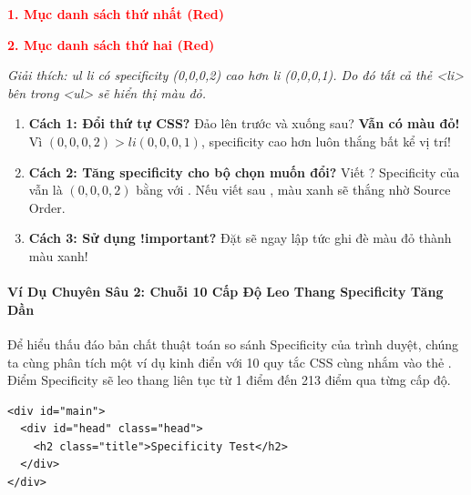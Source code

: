 \begin{browserWindow}
\sffamily\small
\textcolor{red}{\textbf{1. Mục danh sách thứ nhất (Red)}} \par
\textcolor{red}{\textbf{2. Mục danh sách thứ hai (Red)}} \par\vspace{4pt}
{\scriptsize\textcolor{gray!60}{\textit{Giải thích: ul li có specificity (0,0,0,2) cao hơn li (0,0,0,1). Do đó tất cả thẻ <li> bên trong <ul> sẽ hiển thị màu đỏ.}}}
\end{browserWindow}

\begin{conceptBox}
\begin{enumerate}[leftmargin=1.5em, itemsep=3pt, parsep=0pt]
    \item \textbf{Cách 1: Đổi thứ tự CSS?} Đảo  lên trước và  xuống sau? \textbf{Vẫn có màu đỏ!} Vì  $(0,0,0,2) > li (0,0,0,1)$, specificity cao hơn luôn thắng bất kể vị trí!
    \item \textbf{Cách 2: Tăng specificity cho bộ chọn muốn đổi?} Viết ? Specificity của  vẫn là $(0,0,0,2)$ bằng với . Nếu viết  sau , màu xanh sẽ thắng nhờ Source Order.
    \item \textbf{Cách 3: Sử dụng !important?} Đặt  sẽ ngay lập tức ghi đè màu đỏ thành màu xanh!
\end{enumerate}
\end{conceptBox}

\paragraph{Ví Dụ Chuyên Sâu 2: Chuỗi 10 Cấp Độ Leo Thang Specificity Tăng Dần}

Để hiểu thấu đáo bản chất thuật toán so sánh Specificity của trình duyệt, chúng ta cùng phân tích một ví dụ kinh điển với 10 quy tắc CSS cùng nhắm vào thẻ . Điểm Specificity sẽ leo thang liên tục từ 1 điểm đến 213 điểm qua từng cấp độ.

\begin{codeWindow}
\begin{lstlisting}[language=HTML5]
<div id="main">
  <div id="head" class="head">
    <h2 class="title">Specificity Test</h2>
  </div>
</div>
\end{lstlisting}
\end{codeWindow}

